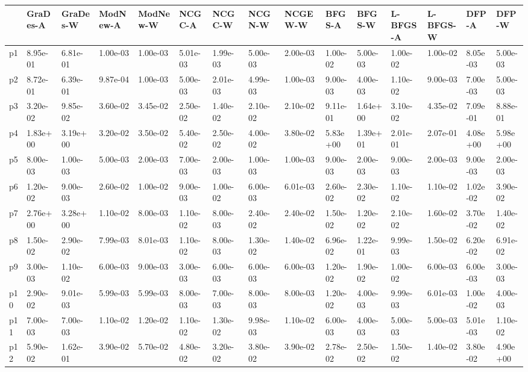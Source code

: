 \begin{tabular}{lllllllllllllll}
\toprule
{} & GraDes-A  & GraDes-W  & ModNew-A  & ModNew-W  &   NCGC-A  &   NCGC-W  &   NCGN-W  &  NCGEW-W  &   BFGS-A  &   BFGS-W  & L-BFGS-A  & L-BFGS-W  &    DFP-A  &    DFP-W  \\
\midrule
p1  &  8.95e-01 &  6.81e-01 &  1.00e-03 &  1.00e-03 &  5.01e-03 &  1.99e-03 &  5.00e-03 &  2.00e-03 &  1.00e-02 &  5.00e-03 &  1.00e-02 &  1.00e-02 &  8.05e-03 &  5.00e-03 \\
p2  &  8.72e-01 &  6.39e-01 &  9.87e-04 &  1.00e-03 &  5.00e-03 &  2.01e-03 &  4.99e-03 &  1.00e-03 &  9.00e-03 &  4.00e-03 &  1.10e-02 &  9.00e-03 &  7.00e-03 &  5.00e-03 \\
p3  &  3.20e-02 &  9.85e-02 &  3.60e-02 &  3.45e-02 &  2.50e-02 &  1.40e-02 &  2.10e-02 &  2.10e-02 &  9.11e-01 &  1.64e+00 &  3.10e-02 &  4.35e-02 &  7.09e-01 &  8.88e-01 \\
p4  &  1.83e+00 &  3.19e+00 &  3.20e-02 &  3.50e-02 &  5.40e-02 &  2.50e-02 &  4.00e-02 &  3.80e-02 &  5.83e+00 &  1.39e+01 &  2.01e-01 &  2.07e-01 &  4.08e+00 &  5.98e+00 \\
p5  &  8.00e-03 &  1.00e-03 &  5.00e-03 &  2.00e-03 &  7.00e-03 &  2.00e-03 &  1.00e-03 &  1.00e-03 &  9.00e-03 &  2.00e-03 &  9.00e-03 &  2.00e-03 &  9.00e-03 &  2.00e-03 \\
p6  &  1.20e-02 &  9.00e-03 &  2.60e-02 &  1.00e-02 &  9.00e-03 &  1.00e-02 &  6.00e-03 &  6.01e-03 &  2.60e-02 &  2.30e-02 &  1.10e-02 &  1.10e-02 &  1.02e-02 &  3.90e-02 \\
p7  &  2.76e+00 &  3.28e+00 &  1.10e-02 &  8.00e-03 &  1.10e-02 &  8.00e-03 &  2.40e-02 &  2.40e-02 &  1.50e-02 &  1.20e-02 &  2.10e-02 &  1.60e-02 &  3.70e-02 &  1.40e-02 \\
p8  &  1.50e-02 &  2.90e-02 &  7.99e-03 &  8.01e-03 &  1.10e-02 &  8.00e-03 &  1.30e-02 &  1.40e-02 &  6.96e-02 &  1.22e-01 &  9.99e-03 &  1.50e-02 &  6.20e-02 &  6.91e-02 \\
p9  &  3.00e-03 &  1.10e-02 &  6.00e-03 &  9.00e-03 &  3.00e-03 &  6.00e-03 &  6.00e-03 &  6.00e-03 &  1.20e-02 &  1.90e-02 &  1.00e-02 &  6.00e-03 &  6.00e-03 &  3.00e-03 \\
p10 &  2.90e-02 &  9.01e-03 &  5.99e-03 &  5.99e-03 &  8.00e-03 &  7.00e-03 &  8.00e-03 &  8.00e-03 &  1.20e-02 &  4.00e-03 &  9.99e-03 &  6.01e-03 &  1.00e-02 &  4.00e-03 \\
p11 &  7.00e-03 &  7.00e-03 &  1.10e-02 &  1.20e-02 &  1.10e-02 &  1.30e-02 &  9.98e-03 &  1.10e-02 &  6.00e-03 &  4.00e-03 &  5.00e-03 &  5.00e-03 &  5.01e-03 &  1.10e-02 \\
p12 &  5.90e-02 &  1.62e-01 &  3.90e-02 &  5.70e-02 &  4.80e-02 &  3.20e-02 &  3.80e-02 &  3.90e-02 &  2.78e-02 &  2.50e-02 &  1.50e-02 &  1.40e-02 &  3.80e-02 &  4.90e+00 \\
\bottomrule
\end{tabular}
